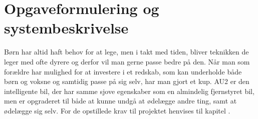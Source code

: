 \chapter{Opgaveformulering og systembeskrivelse} \label{ch:Systembeskrivelse}

Børn har altid haft behov for at lege, men i takt med tiden, bliver teknikken de leger med ofte dyrere og derfor vil man gerne passe bedre på den. Når man som forældre har mulighed for at investere i et redskab, som kan underholde både børn og voksne og samtidig passe på sig selv, har man gjort et kup. AU2 er den intelligente bil, der har samme sjove egenskaber som en almindelig fjernstyret bil, men er opgraderet til både at kunne undgå at ødelægge andre ting, samt at ødelægge sig selv. For de opstillede krav til projektet henvises til kapitel .


